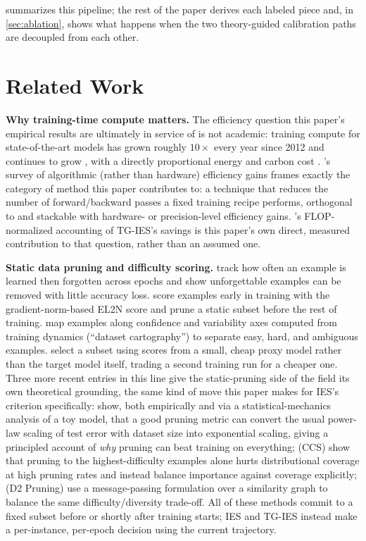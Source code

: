\documentclass{article}
\theoremstyle{plain}
\theoremstyle{definition}
\theoremstyle{remark}
\begin{document}
 summarizes this pipeline; the rest of the paper derives each labeled piece and, in \cref{sec:ablation}, shows what happens when the two theory-guided calibration paths are decoupled from each other.

\section{Related Work}
\label{sec:related}

\textbf{Why training-time compute matters.} The efficiency question this paper's empirical results are ultimately in service of is not academic: training compute for state-of-the-art models has grown roughly $10\times$ every year since 2012 and continues to grow \citep{sevilla2022compute}, with a directly proportional energy and carbon cost \citep{patterson2022carbon}. \citet{bartoldson2023computeefficient}'s survey of algorithmic (rather than hardware) efficiency gains frames exactly the category of method this paper contributes to: a technique that reduces the number of forward/backward passes a fixed training recipe performs, orthogonal to and stackable with hardware- or precision-level efficiency gains. 's FLOP-normalized accounting of TG-IES's savings is this paper's own direct, measured contribution to that question, rather than an assumed one.

\textbf{Static data pruning and difficulty scoring.} \citet{toneva2019empirical} track how often an example is learned then forgotten across epochs and show unforgettable examples can be removed with little accuracy loss. \citet{paul2021deep} score examples early in training with the gradient-norm-based EL2N score and prune a static subset before the rest of training. \citet{swayamdipta2020dataset} map examples along confidence and variability axes computed from training dynamics (``dataset cartography'') to separate easy, hard, and ambiguous examples. \citet{coleman2020selection} select a subset using scores from a small, cheap proxy model rather than the target model itself, trading a second training run for a cheaper one. Three more recent entries in this line give the static-pruning side of the field its own theoretical grounding, the same kind of move this paper makes for IES's criterion specifically: \citet{sorscher2022beyond} show, both empirically and via a statistical-mechanics analysis of a toy model, that a good pruning metric can convert the usual power-law scaling of test error with dataset size into exponential scaling, giving a principled account of \emph{why} pruning can beat training on everything; \citet{zheng2023coverage} (CCS) show that pruning to the highest-difficulty examples alone hurts distributional coverage at high pruning rates and instead balance importance against coverage explicitly; \citet{maharana2024d2} (D2 Pruning) use a message-passing formulation over a similarity graph to balance the same difficulty/diversity trade-off. All of these methods commit to a fixed subset before or shortly after training starts; IES and TG-IES instead make a per-instance, per-epoch decision using the current trajectory.
\end{document}

